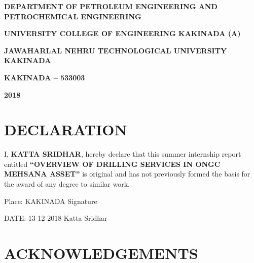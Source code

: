 \documentclass[113pt,a4paper]{report}
\begin{document}
\begin{titlepage}
\begin{center}
\vspace{1em}

\doublespacing

\large \textbf{DEPARTMENT OF PETROLEUM ENGINEERING AND \\
PETROCHEMICAL ENGINEERING}

\large \textbf{UNIVERSITY COLLEGE OF ENGINEERING KAKINADA (A)}

\large \textbf{JAWAHARLAL NEHRU TECHNOLOGICAL UNIVERSITY KAKINADA}

\large \textbf{KAKINADA – 533003}

\large \textbf{2018}

\end{center}
\end{titlepage}

\newpage

\section*{\centering DECLARATION}


\vspace{4em}

\doublespacing


I, \textbf{KATTA SRIDHAR}, hereby declare that this summer internship report entitled \textbf{“OVERVIEW OF DRILLING SERVICES IN ONGC MEHSANA ASSET”} is original and has not previously 
formed the basis for the award of any degree to similar work.


\vspace{5em}

\noindent Place: KAKINADA  \hfill Signature     \hspace{0.02\textwidth}

\vspace{1em}

\noindent DATE: 13-12-2018  \hfill Katta Sridhar




\newpage


\section*{\centering ACKNOWLEDGEMENTS}

\doublespacing


\vspace{1em}
\end{document}
